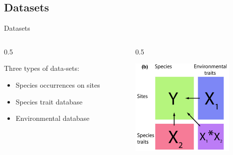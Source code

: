 \documentclass[
  10pt,
  ignorenonframetext,
  table, dvipsname, compress]{beamer}
\providecommand{\tightlist}{%
  \setlength{\itemsep}{0pt}\setlength{\parskip}{0pt}}
\def\bcols{\begin{columns}}
\def\bcol{\begin{column}}
\def\ecol{\end{column}}
\def\ecols{\end{columns}}
\begin{document}
\hypertarget{datasets}{%
\subsection{Datasets}\label{datasets}}

\begin{frame}{Datasets}
\protect\hypertarget{datasets-1}{}
\bcols
\bcol{0.5\textwidth}

Three types of data-sets:

\begin{itemize}
\tightlist
\item
  Species occurrences on sites
\item
  Species trait database
\item
  Environmental database
\end{itemize}

\ecol
\bcol{0.5\textwidth}

\centering \includegraphics[width=5cm]{figs/four-corner-model} \ecol
\ecols
\end{frame}
\end{document}
